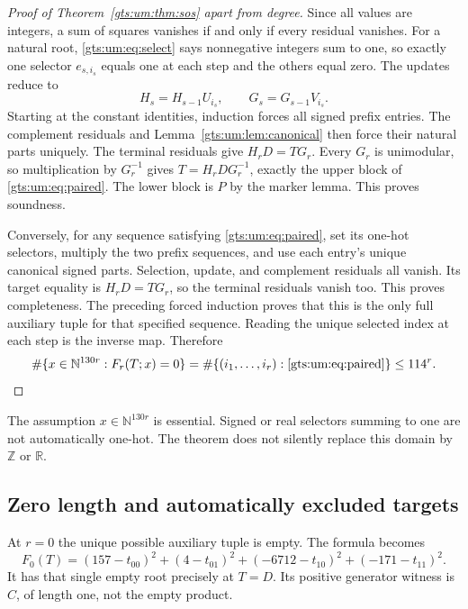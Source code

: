\documentclass[11pt,letterpaper]{article}
\theoremstyle{definition}
\theoremstyle{remark}
\newcommand{\Z}{\mathbb Z}
\newcommand{\N}{\mathbb N}
\begin{document}
\begin{proof}[Proof of Theorem~\ref{gts:um:thm:sos} apart from degree]
Since all values are integers, a sum of squares vanishes if and only if every residual vanishes. For a natural root, \eqref{gts:um:eq:select} says nonnegative integers sum to one, so exactly one selector $e_{s,i_s}$ equals one at each step and the others equal zero. The updates reduce to
\[
 H_s=H_{s-1}U_{i_s},\qquad G_s=G_{s-1}V_{i_s}.
\]
Starting at the constant identities, induction forces all signed prefix entries. The complement residuals and Lemma~\ref{gts:um:lem:canonical} then force their natural parts uniquely. The terminal residuals give $H_rD=TG_r$. Every $G_r$ is unimodular, so multiplication by $G_r^{-1}$ gives $T=H_rDG_r^{-1}$, exactly the upper block of \eqref{gts:um:eq:paired}. The lower block is $P$ by the marker lemma. This proves soundness.

Conversely, for any sequence satisfying \eqref{gts:um:eq:paired}, set its one-hot selectors, multiply the two prefix sequences, and use each entry's unique canonical signed parts. Selection, update, and complement residuals all vanish. Its target equality is $H_rD=TG_r$, so the terminal residuals vanish too. This proves completeness. The preceding forced induction proves that this is the only full auxiliary tuple for that specified sequence. Reading the unique selected index at each step is the inverse map. Therefore
\begin{equation}\label{gts:um:eq:count}
 \#\{x\in\N^{130r}:F_r(T;x)=0\}
 =\#\{(i_1,\ldots,i_r):\eqref{gts:um:eq:paired}\}\leq114^r.
\end{equation}
\end{proof}

The assumption $x\in\N^{130r}$ is essential. Signed or real selectors summing to one are not automatically one-hot. The theorem does not silently replace this domain by $\Z$ or $\mathbb R$.

\subsection{Zero length and automatically excluded targets}
At $r=0$ the unique possible auxiliary tuple is empty. The formula becomes
\begin{equation}\label{gts:um:eq:r0}
 F_0(T)=(157-t_{00})^2+(4-t_{01})^2
              +(-6712-t_{10})^2+(-171-t_{11})^2.
\end{equation}
It has that single empty root precisely at $T=D$. Its positive generator witness is $C$, of length one, not the empty product.
\end{document}
